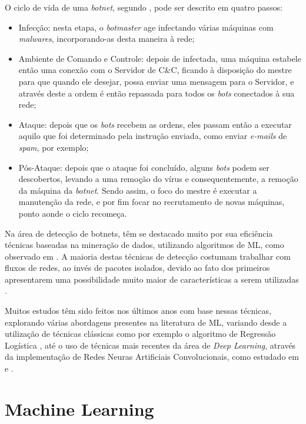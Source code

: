 O ciclo de vida de uma \textit{botnet}, segundo \cite{leonard2009framework}, pode ser descrito em quatro passos:

\begin{itemize}
    \item Infecção: nesta etapa, o \textit{botmaster} age infectando várias máquinas com \textit{malwares}, incorporando-as desta maneira à rede;
    \item Ambiente de Comando e Controle: depois de infectada, uma máquina estabele então uma conexão com o Servidor de C\&C, ficando à disposição do mestre para que quando ele desejar, possa enviar uma mensagem para o Servidor, e através deste a ordem é então repassada para todos os \textit{bots} conectados à sua rede;
    \item Ataque: depois que os \textit{bots} recebem as ordens, eles passam então a executar aquilo que foi determinado pela instrução enviada, como enviar \textit{e-mails} de \textit{spam}, por exemplo;
    \item Pós-Ataque: depois que o ataque foi concluído, alguns \textit{bots} podem ser descobertos, levando a uma remoção do vírus e consequentemente, a remoção da máquina da \textit{botnet}. Sendo assim, o foco do mestre é executar a manutenção da rede, e por fim focar no recrutamento de novas máquinas, ponto aonde o ciclo recomeça.
\end{itemize}

Na área de detecção de botnets, têm se destacado muito por sua eficiência técnicas baseadas na mineração de dados, utilizando algoritmos de ML, como observado em \cite{feily2009survey}. A maioria destas técnicas de detecção costumam trabalhar com fluxos de redes, ao invés de pacotes isolados, devido ao fato dos primeiros apresentarem uma possibilidade muito maior de características a serem utilizadas \cite{beigi2014towards}. 

Muitos estudos têm sido feitos nos últimos anos com base nessas técnicas, explorando várias abordagens presentes na literatura de ML, variando desde a utilização de técnicas clássicas como por exemplo o algoritmo de Regressão Logística \cite{logregbot}, até o uso de técnicas mais recentes da área de \textit{Deep Learning}, através da implementação de Redes Neuras Artificiais Convolucionais, como estudado em \cite{rna1} e \cite{rna2}.

\section{Machine Learning}

